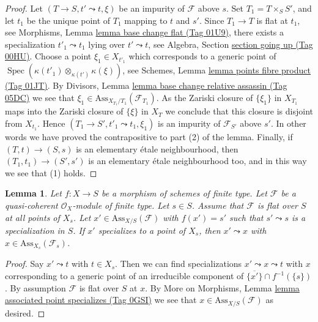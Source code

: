 \documentclass{amsart}
\theoremstyle{plain}
\newtheorem{lemma}[subsection]{Lemma}
\theoremstyle{definition}
\theoremstyle{remark}
\numberwithin{equation}{subsection}
\def\Spec{\mathop{\mathrm{Spec}}}
\begin{document}
\begin{proof}
Let $(T \to S, t' \leadsto t, \xi)$ be an impurity of
$\mathcal{F}$ above $s$. Set $T_1 = T \times_S S'$, and let $t_1$
be the unique point of $T_1$ mapping to $t$ and $s'$. Since
$T_1 \to T$ is flat at $t_1$, see
Morphisms, Lemma \href{https://stacks.math.columbia.edu/tag/01U9}{lemma base change flat (Tag 01U9)},
there exists a specialization $t'_1 \leadsto t_1$ lying over
$t' \leadsto t$, see
Algebra, Section \href{https://stacks.math.columbia.edu/tag/00HU}{section going up (Tag 00HU)}.
Choose a point $\xi_1 \in X_{t'_1}$ which corresponds to a generic
point of $\Spec(\kappa(t'_1) \otimes_{\kappa(t')} \kappa(\xi))$, see
Schemes, Lemma \href{https://stacks.math.columbia.edu/tag/01JT}{lemma points fibre product (Tag 01JT)}.
By
Divisors, Lemma \href{https://stacks.math.columbia.edu/tag/05DC}{lemma base change relative assassin (Tag 05DC)}
we see that $\xi_1 \in \text{Ass}_{X_{T_1}/T_1}(\mathcal{F}_{T_1})$.
As the Zariski closure of $\{\xi_1\}$ in $X_{T_1}$ maps into the
Zariski closure of $\{\xi\}$ in $X_T$ we conclude that
this closure is disjoint from $X_{t_1}$. Hence
$(T_1 \to S', t'_1 \leadsto t_1, \xi_1)$
is an impurity of $\mathcal{F}_{S'}$ above $s'$.
In other words we have proved the contrapositive to part (2) of the
lemma. Finally, if $(T, t) \to (S, s)$ is an elementary
\'etale neighbourhood, then $(T_1, t_1) \to (S', s')$ is an
elementary \'etale neighbourhood too, and in this way we see that (1) holds.
\end{proof}


\begin{lemma}
\label{lemma-associated-point-specializes}
Let $f : X \to S$ be a morphism of schemes of finite type.
Let $\mathcal{F}$ be a quasi-coherent $\mathcal{O}_X$-module of finite type.
Let $s \in S$.
Assume that $\mathcal{F}$ is flat over $S$ at all points of $X_s$.
Let $x' \in \text{Ass}_{X/S}(\mathcal{F})$ with $f(x') = s'$
such that $s' \leadsto s$ is a specialization in $S$. If
$x'$ specializes to a point of $X_s$, then $x' \leadsto x$
with $x \in \text{Ass}_{X_s}(\mathcal{F}_s)$.
\end{lemma}

\begin{proof}
Say $x' \leadsto t$ with $t \in X_s$. Then we can find specializations
$x' \leadsto x \leadsto t$ with $x$ corresponding to a generic
point of an irreducible component of
$\overline{\{x'\}} \cap f^{-1}(\{s\})$. By assumption $\mathcal{F}$ is flat
over $S$ at $x$. By More on Morphisms, Lemma
\href{https://stacks.math.columbia.edu/tag/0GSI}{lemma associated point specializes (Tag 0GSI)}
we see that $x \in \text{Ass}_{X/S}(\mathcal{F})$ as desired.
\end{proof}
\end{document}
